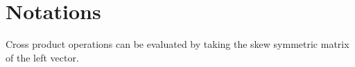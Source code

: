 \section{Notations}

Cross product operations can be evaluated by taking the skew symmetric matrix of the left vector.